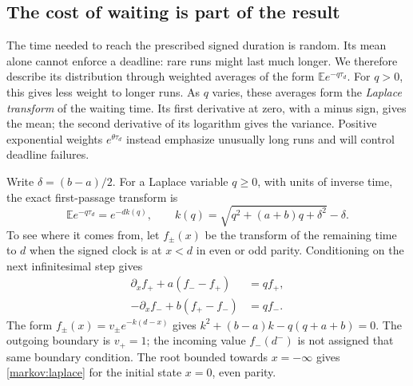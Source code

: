 \documentclass[11pt,a4paper]{article}
\numberwithin{equation}{section}
\theoremstyle{remark}
\begin{document}
\subsection{The cost of waiting is part of the result}

The time needed to reach the prescribed signed duration is random. Its mean
alone cannot enforce a deadline: rare runs might last much longer. We therefore
describe its distribution through weighted averages of the form
$\mathbb E e^{-q\tau_d}$. For $q>0$, this gives less weight to longer runs.
As $q$ varies, these averages form the \emph{Laplace transform} of the waiting
time. Its first derivative at zero, with a minus sign, gives the mean; the
second derivative of its logarithm gives the variance. Positive exponential
weights $e^{\theta\tau_d}$ instead emphasize unusually long runs and will
control deadline failures.

Write $\delta=(b-a)/2$. For a Laplace variable $q\ge0$, with units of
inverse time, the exact first-passage transform is
\begin{equation}
 \mathbb E e^{-q\tau_d}=e^{-d k(q)},\qquad
 k(q)=\sqrt{q^2+(a+b)q+\delta^2}-\delta.
 \label{markov:laplace}
\end{equation}
To see where it comes from, let $f_\pm(x)$ be the transform of the remaining
time to $d$ when the signed clock is at $x<d$ in even or odd parity.
Conditioning on the next infinitesimal step gives
\begin{align}
 \partial_x f_+ +a(f_- -f_+)&=qf_+,\nonumber\\
 -\partial_x f_- +b(f_+-f_-)&=qf_-.
 \label{markov:backward}
\end{align}
The form $f_\pm(x)=v_\pm e^{-k(d-x)}$ gives
$k^2+(b-a)k-q(q+a+b)=0$. The outgoing boundary is $v_+=1$;
the incoming value $f_-(d^-)$ is not assigned that same boundary condition.
The root bounded towards $x=-\infty$ gives \eqref{markov:laplace} for the
initial state $x=0$, even parity.
\end{document}
